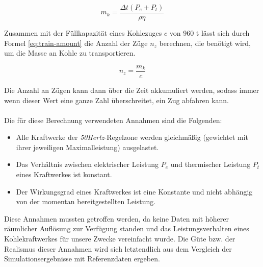 \begin{equation}
    m_k=\frac{\Delta t(P_e+P_t)}{\rho\eta}\label{eq:coal-mass}
\end{equation}

Zusammen mit der Füllkapazität eines Kohlezuges $c$ von 960 t lässt sich durch Formel \ref{eq:train-amount} die Anzahl der Züge $n_z$ berechnen, die benötigt wird, um die Masse an Kohle zu transportieren.

\begin{equation}
    n_z=\frac{m_k}{c}\label{eq:train-amount}
\end{equation}

Die Anzahl an Zügen kann dann über die Zeit akkumuliert werden, sodass immer wenn dieser Wert eine ganze Zahl überschreitet, ein Zug abfahren kann.\\
\\
Die für diese Berechnung verwendeten Annahmen sind die Folgenden:
\begin{itemize}
    \item Alle Kraftwerke der \emph{50Hertz}-Regelzone werden gleichmäßig (gewichtet mit ihrer jeweiligen Maximalleistung) ausgelastet.
    \item Das Verhältnis zwischen elektrischer Leistung $P_e$ und thermischer Leistung $P_t$ eines Kraftwerkes ist konstant.
    \item Der Wirkungsgrad eines Kraftwerkes ist eine Konstante und nicht abhängig von der momentan bereitgestellten Leistung.
\end{itemize}
Diese Annahmen mussten getroffen werden, da keine Daten mit höherer räumlicher Auflösung zur Verfügung standen und das Leistungsverhalten eines Kohlekraftwerkes für unsere Zwecke vereinfacht wurde. Die Güte bzw. der Realismus dieser Annahmen wird sich letztendlich aus dem Vergleich der Simulationsergebnisse mit Referenzdaten ergeben.
